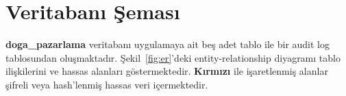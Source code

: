 \documentclass[12pt, a4paper]{report}
\begin{document}
\newpage
\section{Veritabanı Şeması}

\textbf{doga\_pazarlama} veritabanı uygulamaya ait beş adet tablo ile bir audit log tablosundan oluşmaktadır. Şekil~\ref{fig:er}'deki entity-relationship diyagramı tablo ilişkilerini ve hassas alanları göstermektedir. \textcolor{red!70!black}{\textbf{Kırmızı}} ile işaretlenmiş alanlar şifreli veya hash'lenmiş hassas veri içermektedir.

\end{document}
